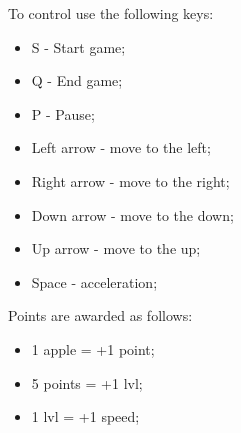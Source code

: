 \documentclass[10pt, oneside]{beamer}
\begin{document}
    \begin{frame}
        \color{blue} To control use the following keys:
        \begin{itemize}
            \item S - Start game;
            \item Q - End game;
            \item P - Pause;
            \item Left arrow - move to the left;
            \item Right arrow - move to the right;
            \item Down arrow - move to the down;
            \item Up arrow - move to the up;
            \item Space - acceleration;
        \end{itemize}
    \end{frame}

    \begin{frame}
        \color{blue} Points are awarded as follows:
        \begin{itemize}
            \item 1 apple = +1 point;
            \item 5 points = +1 lvl;
            \item 1 lvl = +1 speed;
        \end{itemize}
    \end{frame}
\end{document}
